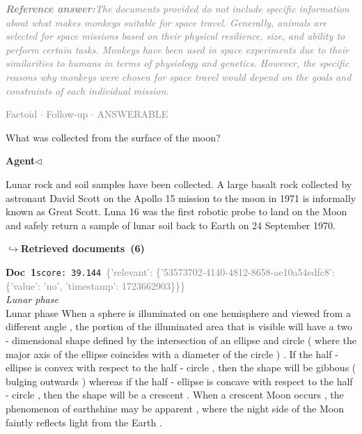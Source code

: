 \documentclass[a4paper,11pt]{article}
\begin{document}
\begin{refanswerenv}
{\footnotesize\textit{\textcolor{gray}{\textbf{Reference answer:}\enspace The documents provided do not include specific information about what makes monkeys suitable for space travel. Generally, animals are selected for space missions based on their physical resilience, size, and ability to perform certain tasks. Monkeys have been used in space experiments due to their similarities to humans in terms of physiology and genetics. However, the specific reasons why monkeys were chosen for space travel would depend on the goals and constraints of each individual mission.}}}
\end{refanswerenv}
\vspace{0.5em}
\hfill{\tiny\textcolor{gray}{Factoid $\cdot$ Follow-up $\cdot$ ANSWERABLE}}
\begin{userbubble}
What was collected from the surface of the moon?
\end{userbubble}
\noindent\hfill{\small\textcolor{agentcolor}{\textbf{Agent\enspace$\triangleleft$}}}
\begin{agentbubble}
Lunar rock and soil samples have been collected. A large basalt rock collected by astronaut David Scott on the Apollo 15 mission to the moon in 1971 is informally known as Great Scott. Luna 16 was the first robotic probe to land on the Moon and safely return a sample of lunar soil back to Earth on 24 September 1970.
\end{agentbubble}
\noindent\hfill{\footnotesize\textcolor{doccolor}{\textbf{$\hookrightarrow$\enspace Retrieved documents~(6)}}}
\begin{docenv}
{\footnotesize\textcolor{doccolor}{\textbf{Doc~1}}}\hfill{\tiny\texttt{score:~39.144}}\ {\tiny\textcolor{gray}{\{'relevant': \{'53573702-4140-4812-8658-ae10a54edfc8': \{'value': 'no', 'timestamp': 1723662903\}\}\}}}\\[3pt]
{\small\textit{Lunar phase}}\\[2pt]
\vspace{2pt}
{\footnotesize Lunar phase
When a sphere is illuminated on one hemisphere and viewed from a different angle , the portion of the illuminated area that is visible will have a two - dimensional shape defined by the intersection of an ellipse and circle ( where the major axis of the ellipse coincides with a diameter of the circle ) . If the half - ellipse is convex with respect to the half - circle , then the shape will be gibbous ( bulging outwards ) whereas if the half - ellipse is concave with respect to the half - circle , then the shape will be a crescent . When a crescent Moon occurs , the phenomenon of earthshine may be apparent , where the night side of the Moon faintly reflects light from the Earth .}
\end{docenv}
\end{document}
